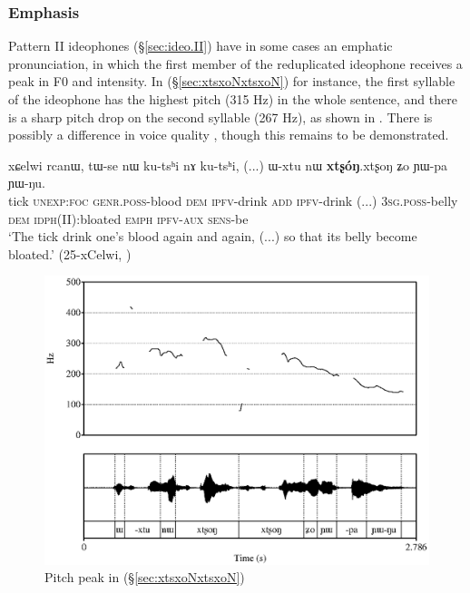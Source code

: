 \subsubsection{Emphasis} \label{sec:emphatic.idph}
Pattern II ideophones (§\ref{sec:ideo.II}) have in some cases an emphatic pronunciation, in which the first member of the reduplicated ideophone receives a peak in F0 and intensity. In (§\ref{sec:xtsxoNxtsxoN}) for instance, the first syllable of the ideophone  has the highest pitch (315 Hz) in the whole sentence, and there is a sharp pitch drop on the second syllable (267 Hz), as shown in . There is possibly a difference in voice quality \citep{japhug14ideophones}, though this remains to be demonstrated.


\begin{exe}
\ex \label{sec:xtsxoNxtsxoN}
\gll xɕelwi rcanɯ, tɯ-se nɯ ku-tsʰi nɤ ku-tsʰi, (...) ɯ-xtu nɯ \textbf{xtʂóŋ}.xtʂoŋ ʑo ɲɯ-pa ɲɯ-ŋu. \\
tick \textsc{unexp}:\textsc{foc} \textsc{genr}.\textsc{poss}-blood \textsc{dem} \textsc{ipfv}-drink \textsc{add} \textsc{ipfv}-drink (...) \textsc{3sg}.\textsc{poss}-belly \textsc{dem} \textsc{idph}(II):bloated \textsc{emph} \textsc{ipfv}-\textsc{aux} \textsc{sens}-be \\
\glt `The tick drink one's blood again and again, (...) so that its belly become bloated.' (25-xCelwi, )
\end{exe}


\begin{figure}
\caption{Pitch peak in (§\ref{sec:xtsxoNxtsxoN})} \label{fig:xtsxoN}
\includegraphics[width=\textwidth]{xtsxoN.eps}
\end{figure}

